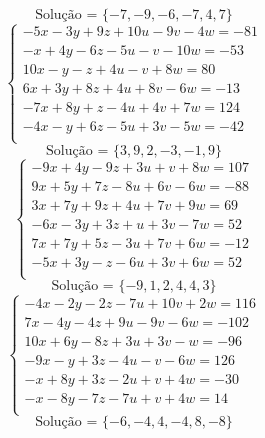 \documentclass[12pt,oneside,a4paper]{article}
\begin{document}
\begin{equation*}
\text{Solução = }\{-7,-9,-6,-7,4,7\}
\end{equation*}
\vspace{\baselineskip}
\begin{equation*}
\begin{cases}
-5x-3y+9z+10u-9v-4w=-81 \\
-x+4y-6z-5u-v-10w=-53 \\
10x-y-z+4u-v+8w=80 \\
6x+3y+8z+4u+8v-6w=-13 \\
-7x+8y+z-4u+4v+7w=124 \\
-4x-y+6z-5u+3v-5w=-42 \\
\end{cases}
\end{equation*}
\begin{equation*}
\text{Solução = }\{3,9,2,-3,-1,9\}
\end{equation*}
\vspace{\baselineskip}
\begin{equation*}
\begin{cases}
-9x+4y-9z+3u+v+8w=107 \\
9x+5y+7z-8u+6v-6w=-88 \\
3x+7y+9z+4u+7v+9w=69 \\
-6x-3y+3z+u+3v-7w=52 \\
7x+7y+5z-3u+7v+6w=-12 \\
-5x+3y-z-6u+3v+6w=52 \\
\end{cases}
\end{equation*}
\begin{equation*}
\text{Solução = }\{-9,1,2,4,4,3\}
\end{equation*}
\vspace{\baselineskip}
\begin{equation*}
\begin{cases}
-4x-2y-2z-7u+10v+2w=116 \\
7x-4y-4z+9u-9v-6w=-102 \\
10x+6y-8z+3u+3v-w=-96 \\
-9x-y+3z-4u-v-6w=126 \\
-x+8y+3z-2u+v+4w=-30 \\
-x-8y-7z-7u+v+4w=14 \\
\end{cases}
\end{equation*}
\begin{equation*}
\text{Solução = }\{-6,-4,4,-4,8,-8\}
\end{equation*}
\end{document}
